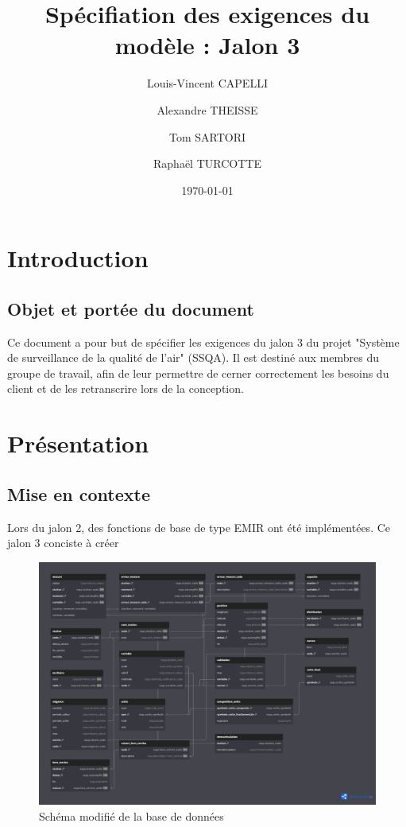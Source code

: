 \documentclass{article}
\begin{document}
\title{Spécifiation des exigences du modèle : Jalon 3}

\author{Louis-Vincent CAPELLI \and Alexandre THEISSE \and Tom SARTORI \and Raphaël TURCOTTE}
\date{\today}
\maketitle
\newpage

\tableofcontents
\newpage

\section{Introduction}
\subsection*{Objet et portée du document}
Ce document a pour but de spécifier les exigences du jalon 3 du projet "Système
de surveillance de la qualité de l'air" (SSQA). Il est destiné aux membres du 
groupe de travail, afin de leur permettre de cerner correctement les besoins
du client et de les retranscrire lors de la conception.

\section{Présentation}
\subsection{Mise en contexte}
Lors du jalon 2, des fonctions de base de type EMIR ont été implémentées. Ce jalon 3 conciste à créer 

\begin{figure}[h]
\centering
\includegraphics[scale=0.24]{modif.png}
\caption{Schéma modifié de la base de données}
\end{figure}
\end{document}

